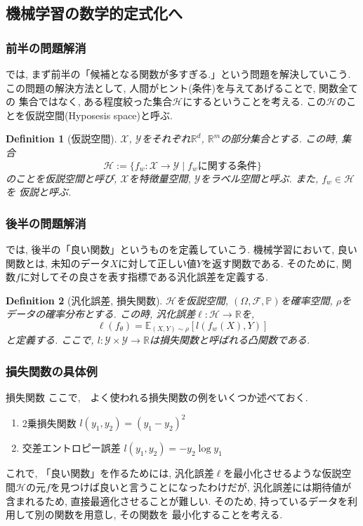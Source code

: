 \documentclass[dvipdfmx,11pt]{beamer}		%
\newtheorem{defi}{Definition}
\newcommand{\R}{\mathbb{R}}
\newcommand{\X}{\mathcal{X}}
\newcommand{\Y}{\mathcal{Y}}
\newcommand{\Hil}{\mathcal{H}}
\begin{document}
    \subsection{機械学習の数学的定式化へ}
    \begin{frame}\frametitle{前半の問題解消}
        では, まず前半の「候補となる関数が多すぎる.」という問題を解決していこう. \\ \indent
        この問題の解決方法として, 人間がヒント(条件)を与えてあげることで, 関数全ての
        集合ではなく, ある程度絞った集合$\Hil$にするということを考える. この$\Hil$のことを仮説空間(Hyposesis space)と呼ぶ.
        \begin{defi}[仮説空間]
            $\X$, $\Y$をそれぞれ$\R^d$, $\R^m$の部分集合とする. この時, 集合
            \begin{equation*}
                \Hil :=\{f_{w} :\X\to\Y\mid\text{$f_{w}$に関する条件}\}
            \end{equation*}
            のことを仮説空間と呼び, $\X$を特徴量空間, $\Y$をラベル空間と呼ぶ. また, $f_w\in\Hil$を
            仮説と呼ぶ. 
        \end{defi}
    \end{frame}
    \begin{frame}\frametitle{後半の問題解消}
        では, 後半の「良い関数」というものを定義していこう. 
        機械学習において, 良い関数とは, 未知のデータ$X$に対して正しい値$Y$を返す関数である. 
        そのために, 関数$f$に対してその良さを表す指標である汎化誤差を定義する.
        \begin{defi}[汎化誤差, 損失関数]
            $\Hil$を仮説空間, $(\Omega, \mathcal{F}, \mathbb{P})$を確率空間, $\rho$をデータの確率分布とする.
            この時, 汎化誤差$\ell:\Hil\to\R$を, 
            \begin{equation*}
                \ell(f_{\theta}) = \mathbb{E}_{(X, Y)\sim\rho}[l(f_{w}(X), Y)]
            \end{equation*}
            と定義する. ここで, $l:\Y\times\Y\to\R$は損失関数と呼ばれる凸関数である. 
        \end{defi}
    \end{frame}
    \begin{frame}
        \frametitle{損失関数の具体例}
        \begin{block}{損失関数}
            ここで,　よく使われる損失関数の例をいくつか述べておく. 
            \begin{enumerate}
                \item 2乗損失関数 $l(y_1, y_2) = (y_1 - y_2)^2$
                \item 交差エントロピー誤差 $l(y_1, y_2) = -y_2\log y_1$
            \end{enumerate}
        \end{block}
        これで, 「良い関数」を作るためには, 汎化誤差$\ell$を最小化させるような仮説空間$\Hil$の元$f$を見つけば良いと言うことになったわけだが, 
        汎化誤差には期待値が含まれるため, 直接最適化させることが難しい. そのため, 持っているデータを利用して別の関数を用意し, その関数を
        最小化することを考える. 
    \end{frame}
\end{document}
